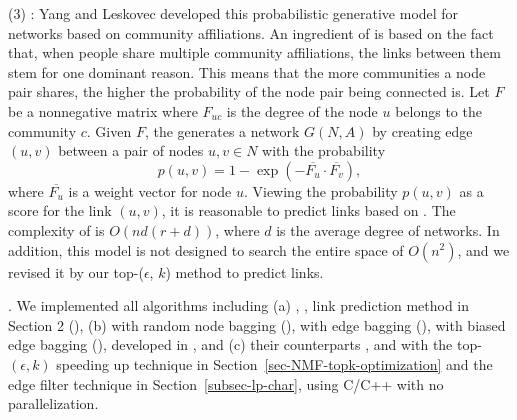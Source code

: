 
\sstab  (3) \CAMBN \cite{yang-wsdm2013}:
  Yang and Leskovec developed this probabilistic generative model for networks
  based on community affiliations. An ingredient of \BIGCLAM is based on the fact that,
  when people share multiple community affiliations, the links between them stem for
  one dominant reason. This means that the more communities a node pair shares,
  the higher the probability of the  node pair being connected is.
  Let $F$ be a nonnegative matrix where $F_{uc}$ is the degree of the node $u$ belongs to
  the community $c$. Given $F$, the \BIGCLAM generates a network $G(N, A)$ by creating edge
  $(u, v)$ between a pair of nodes $u, v \in N$ with the probability
    \[ p(u, v) = 1 - \exp(-\overline{F_u}\cdot \overline{F_v}), \]
where $\overline{F_u}$ is a weight vector for node $u$. Viewing the probability $p(u, v)$ as
  a score for the link $(u, v)$, it is reasonable to predict links based on \BIGCLAM.
The complexity of  \BIGCLAM is $O(nd(r + d) )$, where $d$ is the average degree of networks.
  In addition, this model is not designed to search the entire space of $O( n^2 )$,
  and we revised it by our top-($\epsilon$, $k$) method to predict links.


.
We implemented all algorithms including (a) \Aa, \BIGCLAM,
link prediction method in Section 2 (\NMF),
(b) \NMF with random node bagging (\Node), \NMF with  edge bagging (\Edge),
\NMF with biased edge bagging (\Biased), developed in \cite{liang2016}, and (c) their counterparts \Nodep, \Edgep and \Biasedp with the top-$(\epsilon, k)$ speeding up technique in Section~\ref{sec-NMF-topk-optimization} and the edge filter technique in Section~\ref{subsec-lp-char}, using C/C++ with no parallelization.




